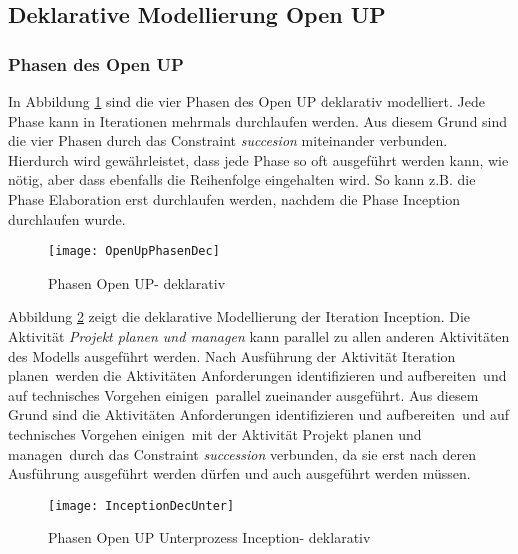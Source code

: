 \clearpage

\subsection{Deklarative Modellierung Open UP}




\subsubsection{Phasen des Open UP}


In Abbildung \ref{fig:OpenUpPhasenDec} sind die vier Phasen des Open UP deklarativ modelliert. Jede Phase kann in Iterationen mehrmals durchlaufen werden. Aus diesem Grund sind die vier Phasen durch das Constraint \textit{succesion} miteinander verbunden. Hierdurch wird gewährleistet, dass jede Phase so oft ausgeführt werden kann, wie nötig, aber dass ebenfalls die Reihenfolge eingehalten wird. So kann z.B. die Phase Elaboration erst durchlaufen werden, nachdem die Phase Inception durchlaufen wurde.
\begin{figure}[htp]
\begin{center}
  \texttt{[image: OpenUpPhasenDec]} %
  \caption{Phasen Open UP- deklarativ}
  \label{fig:OpenUpPhasenDec}
\end{center}
\end{figure}




Abbildung \ref{fig:InceptionDecUnter} zeigt die deklarative Modellierung der Iteration Inception. Die Aktivität \textit{Projekt planen und managen} kann parallel zu allen anderen Aktivitäten des Modells ausgeführt werden.\newline
Nach Ausführung der Aktivität \grqq Iteration planen\grqq \ werden die Aktivitäten \grqq Anforderungen identifizieren und aufbereiten\grqq \ und \grqq auf technisches Vorgehen einigen\grqq \ parallel zueinander ausgeführt. Aus diesem Grund sind die Aktivitäten \grqq Anforderungen identifizieren und aufbereiten\grqq \ und \grqq auf technisches Vorgehen einigen\grqq \ mit der Aktivität \grqq Projekt planen und managen\grqq \ durch das Constraint \textit{succession} verbunden, da sie erst nach deren Ausführung ausgeführt werden dürfen und auch ausgeführt werden müssen. \newline

\begin{figure}[htp]
\begin{center}
  \texttt{[image: InceptionDecUnter]} %
  \caption{Phasen Open UP Unterprozess Inception- deklarativ}
  \label{fig:InceptionDecUnter}
\end{center}
\end{figure}

